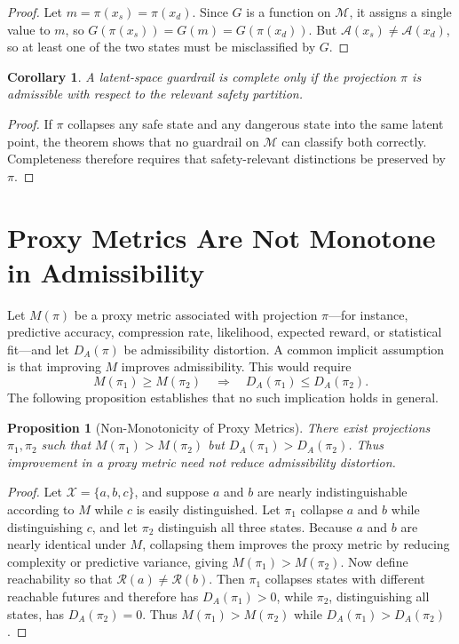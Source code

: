 \documentclass[12pt,a4paper]{article}
\theoremstyle{plain}
\newtheorem{proposition}{Proposition}
\newtheorem{corollary}{Corollary}
\theoremstyle{definition}
\theoremstyle{remark}
\begin{document}
\begin{proof}
Let $m = \pi(x_s) = \pi(x_d)$. Since $G$ is a function on $\mathcal{M}$, it
assigns a single value to $m$, so $G(\pi(x_s)) = G(m) = G(\pi(x_d))$. But
$\mathcal{A}(x_s) \neq \mathcal{A}(x_d)$, so at least one of the two states
must be misclassified by $G$.
\end{proof}

\begin{corollary}
A latent-space guardrail is complete only if the projection $\pi$ is admissible
with respect to the relevant safety partition.
\end{corollary}

\begin{proof}
If $\pi$ collapses any safe state and any dangerous state into the same latent
point, the theorem shows that no guardrail on $\mathcal{M}$ can classify both
correctly. Completeness therefore requires that safety-relevant distinctions be
preserved by $\pi$.
\end{proof}

\section{Proxy Metrics Are Not Monotone in Admissibility}

Let $M(\pi)$ be a proxy metric associated with projection $\pi$---for instance,
predictive accuracy, compression rate, likelihood, expected reward, or
statistical fit---and let $D_A(\pi)$ be admissibility distortion. A common
implicit assumption is that improving $M$ improves admissibility. This would
require
\[
  M(\pi_1) \geq M(\pi_2)
  \quad\Longrightarrow\quad
  D_A(\pi_1) \leq D_A(\pi_2).
\]
The following proposition establishes that no such implication holds in general.

\begin{proposition}[Non-Monotonicity of Proxy Metrics]
There exist projections $\pi_1, \pi_2$ such that $M(\pi_1) > M(\pi_2)$ but
$D_A(\pi_1) > D_A(\pi_2)$. Thus improvement in a proxy metric need not reduce
admissibility distortion.
\end{proposition}

\begin{proof}
Let $\mathcal{X} = \{a, b, c\}$, and suppose $a$ and $b$ are nearly
indistinguishable according to $M$ while $c$ is easily distinguished. Let
$\pi_1$ collapse $a$ and $b$ while distinguishing $c$, and let $\pi_2$
distinguish all three states. Because $a$ and $b$ are nearly identical under
$M$, collapsing them improves the proxy metric by reducing complexity or
predictive variance, giving $M(\pi_1) > M(\pi_2)$. Now define reachability so
that $\mathcal{R}(a) \neq \mathcal{R}(b)$. Then $\pi_1$ collapses states with
different reachable futures and therefore has $D_A(\pi_1) > 0$, while $\pi_2$,
distinguishing all states, has $D_A(\pi_2) = 0$. Thus $M(\pi_1) > M(\pi_2)$
while $D_A(\pi_1) > D_A(\pi_2)$.
\end{proof}
\end{document}
